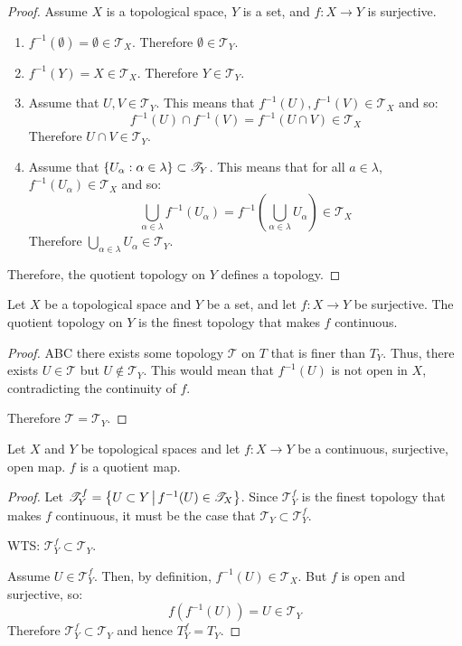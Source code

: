 \documentclass[letterpaper,12pt,fleqn]{article}
\newcommand{\T}{\mathscr{T}}
\renewcommand{\a}{\alpha}
\renewcommand{\l}{\lambda}
\begin{document}
\begin{proof}
  Assume \(X\) is a topological space, \(Y\) is a set, and \(f:X\to Y\) is surjective.
  \begin{enumerate}
  \item \(f^{-1}(\emptyset)=\emptyset\in\T_X\).  Therefore \(\emptyset\in\T_Y\).

  \item \(f^{-1}(Y)=X\in\T_X\).  Therefore \(Y\in\T_Y\).

  \item Assume that \(U,V\in\T_Y\).  This means that \(f^{-1}(U),f^{-1}(V)\in\T_X\) and so:
    \[f^{-1}(U)\cap f^{-1}(V)=f^{-1}(U\cap V)\in\T_X\]
    Therefore \(U\cap V\in\T_Y\).

  \item Assume that \(\set{U_{\a}:\a\in\l}\subset\T_Y\).  This means that for all \(a\in\l\),
    \(f^{-1}(U_{\a})\in\T_X\) and so:
    \[\bigcup_{\a\in\l}f^{-1}(U_{\a})=f^{-1}(\bigcup_{\a\in\l}U_{\a})\in\T_X\]
    Therefore \(\bigcup_{\a\in\l}U_{\a}\in\T_Y\).
  \end{enumerate}

  Therefore, the quotient topology on \(Y\) defines a topology.
\end{proof}

\begin{theorem}
  Let \(X\) be a topological space and \(Y\) be a set, and let \(f:X\to Y\) be surjective.  The quotient topology on
  \(Y\) is the finest topology that makes \(f\) continuous.
\end{theorem}

\begin{proof}
  ABC there exists some topology \(\T\) on \(T\) that is finer than \(T_Y\).  Thus, there exists \(U\in\T\) but
  \(U\notin\T_Y\).  This would mean that \(f^{-1}(U)\) is not open in \(X\), contradicting the continuity of \(f\).

  Therefore \(\T=\T_Y\).
\end{proof}

\begin{theorem}
  Let \(X\) and \(Y\) be topological spaces and let \(f:X\to Y\) be a continuous, surjective, open map.  \(f\) is
  a quotient map.
\end{theorem}

\begin{proof}
  Let \(\T_Y^f=\setb{U\subset Y}{f^{-1}(U)\in\T_X}\).  Since \(\T_Y^f\) is the finest topology that makes \(f\)
  continuous, it must be the case that \(\T_Y\subset\T_Y^f\).

  WTS: \(\T_Y^f\subset\T_Y\).

  Assume \(U\in\T_Y^f\).  Then, by definition, \(f^{-1}(U)\in\T_X\).  But \(f\) is open and surjective, so:
  \[f(f^{-1}(U))=U\in\T_Y\]
  Therefore \(\T_Y^f\subset\T_Y\) and hence \(T_Y^f=T_Y\).
\end{proof}
\end{document}
